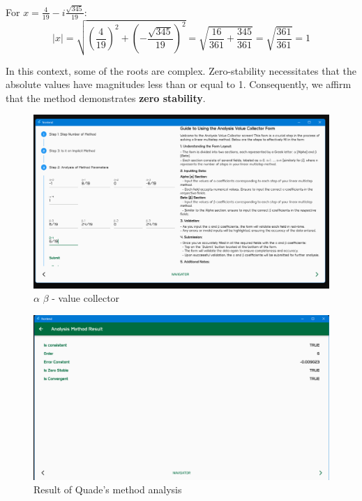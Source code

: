 For \( x = \frac{4}{19} - i\frac{\sqrt{345}}{19} \):
\[
|x| = \sqrt{\left(\frac{4}{19}\right)^2 + \left(-\frac{\sqrt{345}}{19}\right)^2} = \sqrt{\frac{16}{361} + \frac{345}{361}} = \sqrt{\frac{361}{361}} = 1
\]

In this context, some of the roots are complex. Zero-stability necessitates that the absolute values have magnitudes less than or equal to 1. Consequently, we affirm that the method demonstrates \textbf{zero stability}.



\begin{figure}[htbp]
    \centering
    \includegraphics[width=1\textwidth]{chapters/4/image/1.png}
    \caption{$\alpha$ $\beta$ - value collector}
\end{figure}

\begin{figure}[htbp]
    \centering
    \includegraphics[width=1\textwidth]{chapters/4/image/2.png}
    \caption{Result of Quade's method analysis}
\end{figure}

\newpage

